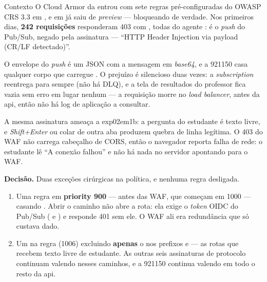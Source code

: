 \begin{especificacao}{Contexto}
O Cloud Armor da  entrou com sete regras pré-configuradas do
OWASP CRS 3.3 em , e em  já saiu de \emph{preview}
--- bloqueando de verdade. Nos primeiros dias, \textbf{242 requisições}
 responderam 403 com
, todas do agente : é o
\emph{push} do Pub/Sub, negado pela assinatura
 --- \enquote{HTTP Header
Injection via payload (CR/LF detectado)}.

O envelope do \emph{push} é um JSON com a mensagem em \emph{base64}, e a 921150
casa qualquer corpo que carregue . O
prejuízo é silencioso duas vezes: a \emph{subscription} reentrega para sempre
(não há DLQ), e a tela de resultados do professor fica vazia sem erro em lugar
nenhum --- a requisição morre no \emph{load balancer}, antes da api, então não
há log de aplicação a consultar.

A mesma assinatura ameaça a exp02em1b: a pergunta do estudante é texto livre, e
\emph{Shift+Enter} ou colar de outra aba produzem quebra de linha legítima. O
403 do WAF não carrega cabeçalho de CORS, então o navegador reporta falha de
rede: o estudante lê \enquote{A conexão falhou} e não há nada no servidor
apontando para o WAF.
\end{especificacao}

\textbf{Decisão.} Duas exceções cirúrgicas na política, e nenhuma regra
desligada.

\begin{enumerate}
  \item Uma regra  em \textbf{priority 900} --- antes das WAF, que
    começam em 1000 --- casando
    . Abrir o caminho não abre
    a rota: ela exige o \emph{token} OIDC do Pub/Sub
    ( e ) e responde
    401 sem ele. O WAF ali era redundância que só custava dado.
  \item Um  na regra  (1006)
    excluindo \textbf{apenas} o  nos prefixos
     e  --- as rotas que recebem texto livre de
    estudante. As outras seis assinaturas de protocolo continuam valendo
    nesses caminhos, e a 921150 continua valendo em todo o resto da api.
\end{enumerate}

